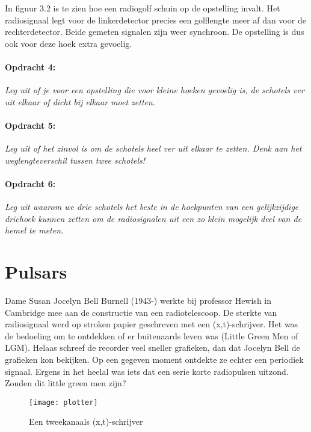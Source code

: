 In figuur 3.2 is te zien hoe een radiogolf schuin op de opstelling
invalt. Het radiosignaal legt voor de linkerdetector precies een golflengte
meer af dan voor de rechterdetector. Beide gemeten signalen zijn weer
synchroon. De opstelling is dus ook voor deze hoek extra gevoelig. 


\paragraph*{Opdracht 4:}

\emph{Leg uit of je voor een opstelling die voor kleine hoeken gevoelig
is, de schotels ver uit elkaar of dicht bij elkaar moet zetten.}


\paragraph*{Opdracht 5:}

\emph{Leg uit of het zinvol is om de schotels heel ver uit elkaar
te zetten. Denk aan het weglengteverschil tussen twee schotels!}


\paragraph*{Opdracht 6:}

\emph{Leg uit waarom we drie schotels het beste in de hoekpunten van
een gelijkzijdige driehoek kunnen zetten om de radiosignalen uit een
zo klein mogelijk deel van de hemel te meten.}


\section{Pulsars}

Dame Susan Jocelyn Bell Burnell (1943-) werkte bij professor Hewish
in Cambridge mee aan de constructie van een radiotelescoop. De sterkte
van radiosignaal werd op stroken papier geschreven met een (x,t)-schrijver.
Het was de bedoeling om te ontdekken of er buitenaards leven was (Little
Green Men of LGM). Helaas schreef de recorder veel sneller grafieken,
dan dat Jocelyn Bell de grafieken kon bekijken. Op een gegeven moment
ontdekte ze echter een periodiek signaal. Ergens in het heelal was
iets dat een serie korte radiopulsen uitzond. Zouden dit little green
men zijn?

\begin{figure}[H]
\noindent \begin{centering}
\texttt{[image: plotter]}
\par\end{centering}

\caption{Een tweekanaals (x,t)-schrijver}
\end{figure}


